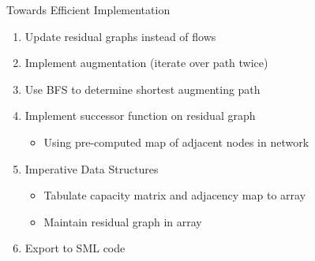\documentclass[fleqn]{beamer}
\begin{document}
\begin{frame}{Towards Efficient Implementation}
  {}
  \begin{enumerate}
   \item<+-> Update residual graphs instead of flows
   \item<+-> Implement augmentation (iterate over path twice)
   \item<+-> Use BFS to determine shortest augmenting path
   \item<+-> Implement successor function on residual graph
    \begin{itemize}
     \item Using pre-computed map of adjacent nodes in network
    \end{itemize}
   \item<+-> Imperative Data Structures
    \begin{itemize}
     \item Tabulate capacity matrix and adjacency map to array
     \item Maintain residual graph in array
    \end{itemize}
   \item<+-> Export to SML code

  \end{enumerate}
\end{frame}
\end{document}
